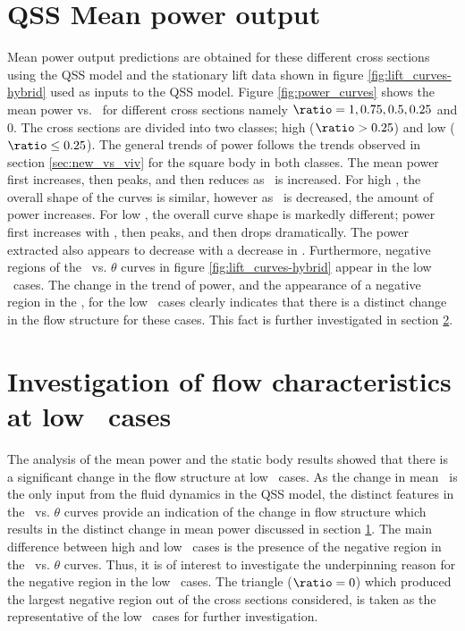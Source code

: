  
 
 \section{QSS Mean power output}
 \label{sec:cross-sec-qss-mean power}
 
 
 
 Mean power output predictions are obtained for these different cross sections using the QSS model and the stationary lift data shown in figure \ref{fig:lift_curves-hybrid} used as inputs to the QSS model. Figure \ref{fig:power_curves} shows the mean power vs. \massdamp\ for different cross sections namely $\ratio=1,0.75,0.5,0.25$ and $0$. The cross sections are divided into two classes; high ($\ratio > 0.25$) and low ($\ratio \leq 0.25$). The general trends of power follows the trends observed in section \ref{sec:new_vs_viv} for the square body in both classes. The mean power first increases, then peaks, and then reduces as \massdamp\ is increased. For high \ratio, the overall shape of the curves is similar, however as \ratio\ is decreased, the amount of power increases. For low \ratio, the overall curve shape is markedly different; power first increases with \massdamp, then peaks, and then drops dramatically. The power extracted also appears to decrease with a decrease in \ratio. Furthermore, negative regions of the \cy\ vs. $\theta$ curves in figure \ref{fig:lift_curves-hybrid} appear in the low \ratio\ cases. The change in the trend of power, and the appearance of a negative region in the \cy, for the low \ratio\ cases clearly indicates that there is a distinct change in the flow structure for these cases. This fact is further investigated in section \ref{sec:negative-region}.

\section{Investigation of flow characteristics at low \ratio\ cases}
 \label{sec:negative-region}

The analysis of the mean power and the static body results showed that there is a significant change in the flow structure at low \ratio\ cases. As the change in mean \cy\ is the only input from the fluid dynamics in the QSS model, the distinct features in the \cy\ vs. $\theta$ curves provide an indication of the change in flow structure which results in the distinct change in mean power discussed in section \ref{sec:cross-sec-qss-mean power}. The main difference between high and low \ratio\ cases is the presence of the negative region in the \cy\ vs. $\theta$ curves. Thus, it is of interest to investigate the underpinning reason for the negative region in the low \ratio\ cases. The triangle ($\ratio=0$) which produced the largest negative region out of the cross sections considered, is taken as the representative of the low \ratio\ cases for further investigation. 

